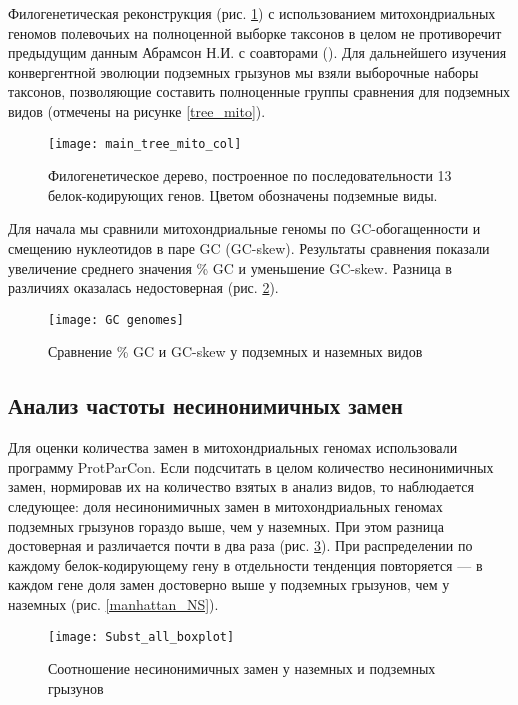 Филогенетическая реконструкция (рис. \ref{Tree_13_genes}) с использованием митохондриальных геномов полевочьих на полноценной выборке таксонов в целом не противоречит предыдущим данным Абрамсон Н.И. с соавторами (\cite{Abramson2009}). Для дальнейшего изучения конвергентной эволюции подземных грызунов мы взяли выборочные наборы таксонов, позволяющие составить полноценные группы сравнения для подземных видов (отмечены на рисунке \ref{tree_mito}). 

\begin{figure}[h!]
\begin{center}
	\texttt{[image: main\_tree\_mito\_col]}
\end{center}
	\caption{Филогенетическое дерево, построенное по последовательности 13 белок-кодирующих генов. Цветом обозначены подземные виды.}
	\label{Tree_13_genes}
\end{figure}


Для начала мы сравнили митохондриальные геномы по GC-обогащенности и смещению нуклеотидов в паре GC (GC-skew). Результаты сравнения показали увеличение среднего значения \% GC и уменьшение GC-skew. Разница в различиях оказалась недостоверная (рис. \ref{boxplot_GC_GSskew}). 

\begin{figure}[h!]
\begin{center}
	\texttt{[image: GC genomes]}
\end{center}
\caption{Сравнение \% GC и GC-skew у подземных и наземных видов}\label{boxplot_GC_GSskew}
\end{figure}


\subsection{Анализ частоты несинонимичных замен}

Для оценки количества замен в митохондриальных геномах использовали программу ProtParCon. Если подсчитать в целом количество несинонимичных замен, нормировав их на количество взятых в анализ видов, то наблюдается следующее: доля несинонимичных замен в митохондриальных геномах подземных грызунов гораздо выше, чем у наземных. При этом разница достоверная и различается почти в два раза (рис. \ref{boxplot_NS}). При распределении по каждому белок-кодирующему гену в отдельности тенденция повторяется --- в каждом гене доля замен достоверно выше у подземных грызунов, чем у наземных (рис. \ref{manhattan_NS}).

\begin{figure}[h!]
\begin{center}
	\texttt{[image: Subst\_all\_boxplot]}
\end{center}
	\caption{Соотношение несинонимичных замен у наземных и подземных грызунов}\label{boxplot_NS}
\end{figure}


